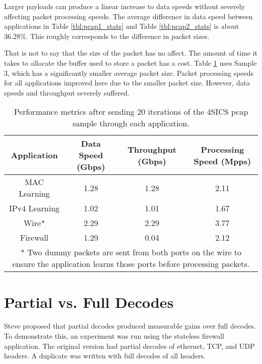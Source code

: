 Larger payloads can produce a linear increase to data speeds without severely affecting packet processing speeds. The average difference in data speed between applications in Table \ref{tbl:pcap1_stats} and Table \ref{tbl:pcap2_stats} is about 36.28\%. This roughly corresponds to the difference in packet sizes.

That is not to say that the size of the packet has no affect. The amount of time it takes to allocate the buffer used to store a packet has a cost. Table \ref{tbl:pcap3_stats} uses Sample 3, which has a significantly smaller average packet size. Packet processing speeds for all applications improved here due to the smaller packet size. However, data speeds and throughput severely suffered.

\begin{table}[ht]
\caption{Performance metrics after sending 20 iterations of the 4SICS pcap sample through each application.}
\begin{center}
\begin{tabularx}{\textwidth}{| c || c | c | c | }
\hline
Application & Data Speed (Gbps) & Throughput (Gbps) & Processing Speed (Mpps) \\
\hline
MAC Learning & 1.28 & 1.28 & 2.11  \\
\hline
IPv4 Learning & 1.02 & 1.01 & 1.67  \\
\hline 
Wire* & 2.29 & 2.29 & 3.77 \\
\hline
Firewall & 1.29 & 0.04 & 2.12 \\
\hline
\multicolumn{4}{p{\linewidth}}{* Two dummy packets are sent from both ports on the wire to ensure the application learns those ports before processing packets.}
\end{tabularx}
\end{center}
\label{tbl:pcap3_stats}
\end{table}


\section{Partial vs. Full Decodes} \label{exp:decode_comparison}

Steve proposed that partial decodes produced measurable gains over full decodes. To demonstrate this, an experiment was run using the stateless firewall application. The original version had partial decodes of ethernet, TCP, and UDP headers. A duplicate was written with full decodes of all headers.

